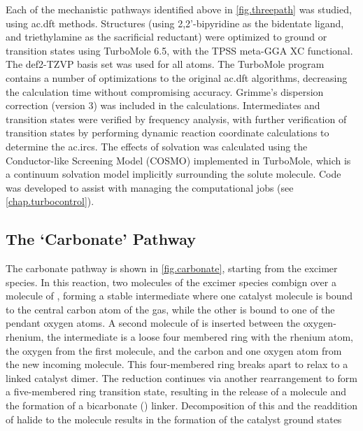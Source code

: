 Each of the mechanistic pathways identified above in \autoref{fig.threepath} was studied, using \gls{ac.dft} methods. Structures (using 2,2'-bipyridine as the bidentate ligand, and triethylamine as the sacrificial reductant) were optimized to ground or transition states using TurboMole 6.5\autocite{turbomole, ahlrichs1989}, with the TPSS meta-GGA XC functional\autocite{tao2003}. The def2-TZVP basis set was used for all atoms\autocite{schafer1994, weigend2005}. The TurboMole program contains a number of optimizations to the original \gls{ac.dft} algorithms\autocite{haase1993, treutler1995, eichkorn1997, eichkorn1995, sierka2003, deglmann2004, weigend2002, vonarnim1998, ahlrichs2004}, decreasing the calculation time without compromising accuracy. Grimme's dispersion correction (version 3) was included in the calculations\autocite{grimme2010}. Intermediates and transition states were verified by frequency analysis\autocite{deglmann2004, deglmann2002, grimme2002}, with further verification of transition states by performing dynamic reaction coordinate calculations to determine the \glspl{ac.irc}. The effects of solvation was calculated using the Conductor-like Screening Model (COSMO) implemented in TurboMole\autocite{klamt1993}, which is a continuum solvation model implicitly surrounding the solute molecule. Code was developed to assist with managing the computational jobs (see \autoref{chap.turbocontrol}). 

\subsection{The `Carbonate' Pathway}
The carbonate pathway is shown in \autoref{fig.carbonate}, starting from the excimer species. In this reaction, two molecules of the excimer species combign over a molecule of , forming a stable intermediate where one catalyst molecule is bound to the central carbon atom of the gas, while the other is bound to one of the pendant oxygen atoms. A second molecule of  is inserted between the oxygen-rhenium, the intermediate is a loose four membered ring with the rhenium atom, the oxygen from the first  molecule, and the carbon and one oxygen atom from the new incoming molecule. This four-membered ring breaks apart to relax to a  linked catalyst dimer. The  reduction continues via another rearrangement to form a five-membered ring transition state, resulting in the release of a  molecule and the formation of a bicarbonate () linker. Decomposition of this and the readdition of halide to the molecule results in the formation of the catalyst ground states

